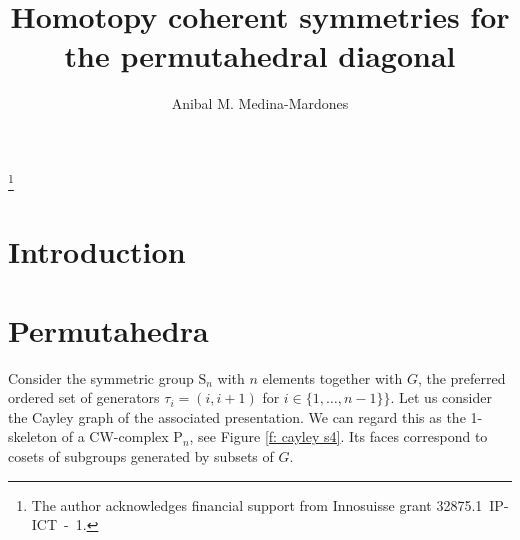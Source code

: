 \documentclass{amsart}
\renewcommand{\S}{\mathrm S}
\renewcommand{\P}{\mathrm P}
\begin{document}
	
\title{Homotopy coherent symmetries for the permutahedral diagonal}
\author{Anibal M. Medina-Mardones}
\address{Max Plank Institute for Mathematics, Bonn, Germany}
\address{Department of Mathematics, University of Notre Dame, Notre Dame, IN, USA}
\thanks{The author acknowledges financial support from Innosuisse grant \mbox{32875.1 IP-ICT - 1}.}

\begin{abstract}
	
\end{abstract} 

\vspace*{-1cm}

\maketitle

\section{Introduction}

\section{Permutahedra}

Consider the symmetric group $\S_n$ with $n$ elements together with $G$, the preferred ordered set of generators $\tau_i = (i, i+1)$ for $i \in \{1,\dots,n-1\}\}$.
Let us consider the Cayley graph of the associated presentation.
We can regard this as the 1-skeleton of a CW-complex $\P_n$, see Figure \ref{f: cayley s4}.
Its faces correspond to cosets of subgroups generated by subsets of $G$.
\end{document}
